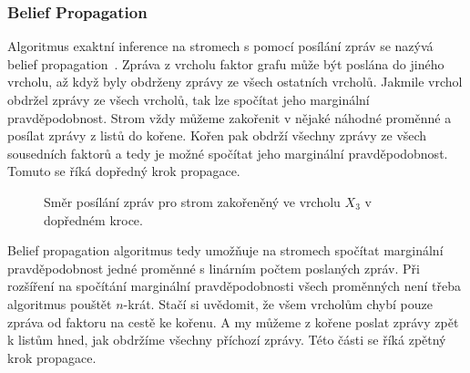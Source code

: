 \subsubsection{Belief Propagation}

Algoritmus exaktní inference na stromech s pomocí posílání zpráv se nazývá belief propagation~\cite{pearl1988probabilistic}.
Zpráva z vrcholu faktor grafu může být poslána do jiného vrcholu, až když byly obdrženy zprávy ze všech ostatních vrcholů.
Jakmile vrchol obdržel zprávy ze všech vrcholů, tak lze spočítat jeho marginální pravděpodobnost.
Strom vždy můžeme zakořenit v nějaké náhodné proměnné a posílat zprávy z listů do kořene.
Kořen pak obdrží všechny zprávy ze všech sousedních faktorů a tedy je možné spočítat jeho marginální pravděpodobnost.
Tomuto se říká dopředný krok propagace.

\begin{figure}[H]
\begin{center}
\end{center}
\caption{Směr posílání zpráv pro strom zakořeněný ve vrcholu $X_3$ v dopředném kroce.}
\end{figure}

Belief propagation algoritmus tedy umožňuje na stromech spočítat marginální pravděpodobnost jedné proměnné s linárním počtem poslaných zpráv.
Při rozšíření na spočítání marginální pravděpodobnosti všech proměnných není třeba algoritmus pouštět $n$-krát.
Stačí si uvědomit, že všem vrcholům chybí pouze zpráva od faktoru na cestě ke kořenu.
A my můžeme z kořene poslat zprávy zpět k listům hned, jak obdržíme všechny příchozí zprávy.
Této části se říká zpětný krok propagace.

